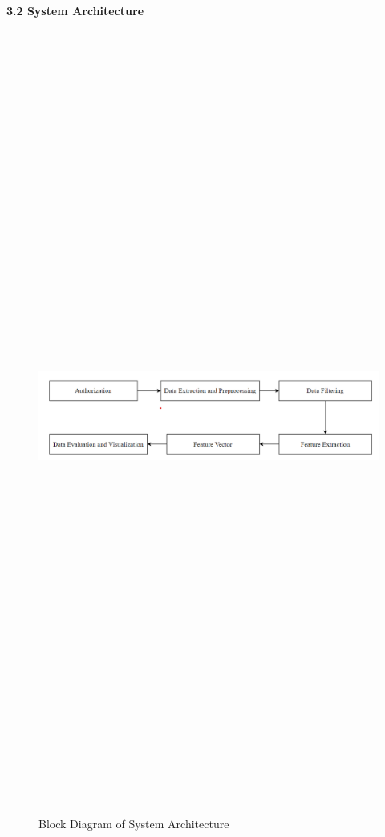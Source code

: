 \documentclass[a4paper,12pt]{article}
\begin{document}
{{{			      			      			      			      
		
								
		\clearpage
								
								
		\begin{flushleft}
			\fontsize{13}{15}\selectfont\textbf{3.2 System Architecture}
			\label{architecture}
		\end{flushleft}
								
		\begin{figure}[h]
			\centering
			\includegraphics[width=6in, height=10in, keepaspectratio]{block_diagram.png}
			\label{block-diagram}
			\caption{Block Diagram of System Architecture}
		\end{figure}
								
}}}
\end{document}
